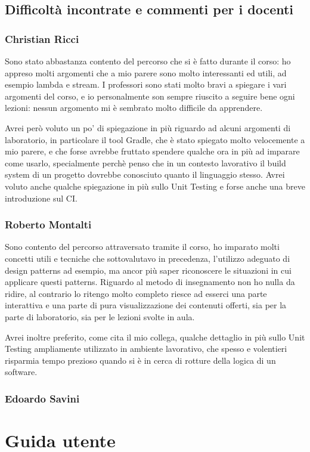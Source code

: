 \section{Difficoltà incontrate e commenti per i docenti}

\subsection{Christian Ricci}

Sono stato abbastanza contento del percorso che si è fatto durante il corso: ho appreso molti argomenti che a mio parere sono molto interessanti ed utili, ad esempio lambda e stream. I professori sono stati molto bravi a spiegare i vari argomenti del corso, e io personalmente son sempre riuscito a seguire bene ogni lezioni: nessun argomento mi è sembrato molto difficile da apprendere.

Avrei però voluto un po' di spiegazione in più riguardo ad alcuni argomenti di laboratorio, in particolare il tool Gradle, che è stato spiegato molto velocemente a mio parere, e che forse avrebbe fruttato spendere qualche ora in più ad imparare come usarlo, specialmente perchè penso che in un contesto lavorativo il build system di un progetto dovrebbe conosciuto quanto il linguaggio stesso. Avrei voluto anche qualche spiegazione in più sullo Unit Testing e forse anche una breve introduzione sul CI.

\subsection{Roberto Montalti}

Sono contento del percorso attraversato tramite il corso, ho imparato molti concetti utili e tecniche che sottovalutavo in precedenza, l'utilizzo adeguato di design patterns ad esempio, ma ancor più 
saper riconoscere le situazioni in cui applicare questi patterns.
Riguardo al metodo di insegnamento non ho nulla da ridire, al contrario lo ritengo molto completo riesce ad esserci una parte interattiva e una parte di pura visualizzazione dei contenuti offerti, sia per la parte di laboratorio, sia per le lezioni svolte in aula. 

Avrei inoltre preferito, come cita il mio collega, qualche dettaglio in più sullo Unit Testing ampliamente utilizzato in ambiente lavorativo, che spesso e volentieri risparmia tempo prezioso quando si è in cerca di rotture della logica di un software.

\subsection{Edoardo Savini}

\appendix

\chapter{Guida utente}





